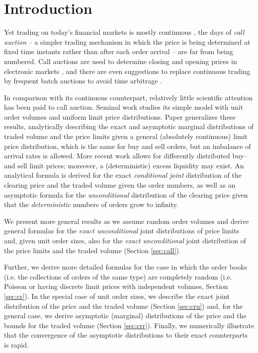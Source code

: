 \documentclass{aptpub}
\begin{document}
\section{Introduction}

Yet trading on today's financial markets is mostly continuous \cite{friedman2018double}, the days of {\em call auction} -- a simpler trading mechanism in which the price is being determined at fixed time instants rather than after each order arrival -- are far from being numbered. Call auctions are used to determine closing and opening prices in electronic markets \cite{toke2015exact}, and there are even suggestions to replace continuous trading by frequent batch auctions to avoid time arbitrage \cite{budish2015high}. 

In comparison with its continuous counterpart, relatively little scientific attention has been paid to call auction. Seminal work \cite{mendelson1982market} studies its simple model with unit order volumes and uniform limit price distributions. Paper \cite{toke2015exact}  generalizes these results, analytically describing the exact and asymptotic marginal distributions of traded volume and the price limits given a general (absolutely continuous) limit price distribution, which is the same for buy and sell orders, but an imbalance of arrival rates is allowed. More recent work \cite{derksen2020clearing} allows for differently distributed buy-- and sell limit prices; moreover, a (deterministic) excess liquidity may exist. An analytical formula is derived for the exact {\em conditional joint} distribution of the clearing price and the traded volume given the order numbers, as well as an asymptotic formula for the {\em unconditional} distribution of the clearing price given that the {\em deterministic} numbers of orders grow to infinity. 

We present more general results as we assume random order volumes and
derive general formulas for the {\em exact unconditional} joint distributions of price limits and, given unit order sizes, also for the {\em exact unconditional} joint distribution of the price limits and the traded volume (Section \ref{sec:call}). 

Further, we derive more detailed formulas for the case in which the order books (i.e. the collections of orders of the same type) are completely random (i.e. Poisson or having discrete limit prices with independent volumes, Section \ref{sec:cr}). In the special case of unit order sizes, we describe the exact joint distribution of the price and the traded volume (Section \ref{sec:cru}) and, for the general case, we derive asymptotic (marginal) distributions of the price and the bounds for the traded volume (Section \ref{sec:crr}). Finally, we numerically illustrate that the convergence of the asymptotic distributions to their exact counterparts is rapid.
\end{document}
